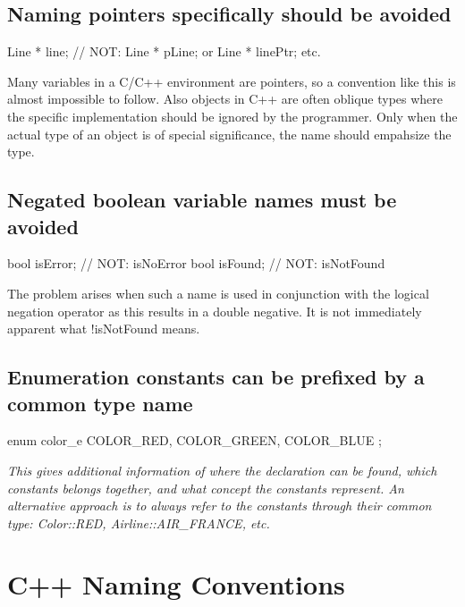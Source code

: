 \documentclass[a4paper,11pt,oneside]{scrbook}
\newcommand{\guideline}[1]{{\subsection{#1}}}
\newcommand{\motivation}[1]{{\normalfont \itshape #1}}
\newcommand{\trcode}[1]{{\normalfont \ttfamily #1}}
\begin{document}
\guideline{Naming pointers specifically should be avoided}

\begin{code}
  Line * line;  // NOT: Line * pLine; or Line * linePtr; etc. 
\end{code}

Many variables in a C/C++ environment are pointers, so a convention like this is
almost impossible to follow. Also objects in C++ are often oblique types where
the specific implementation should be ignored by the programmer. Only when the
actual type of an object is of special significance, the name should empahsize
the type.

\guideline{Negated boolean variable names must be avoided}

\begin{code}
  bool isError; // NOT: isNoError
  bool isFound; // NOT: isNotFound 
\end{code}

The problem arises when such a name is used in conjunction with the logical
negation operator as this results in a double negative. It is not immediately
apparent what \trcode{!isNotFound} means.

\guideline{Enumeration constants can be prefixed by a common type name}

\begin{code}
  enum color_e {
    COLOR_RED,
    COLOR_GREEN,
    COLOR_BLUE
  }; 
\end{code}

\motivation{
  This gives additional information of where the declaration can be found, which
  constants belongs together, and what concept the constants represent. An
  alternative approach is to always refer to the constants through their common
  type: \trcode{Color::RED}, \trcode{Airline::AIR\_FRANCE}, etc.
}

\section{C++ Naming Conventions}
\end{document}
